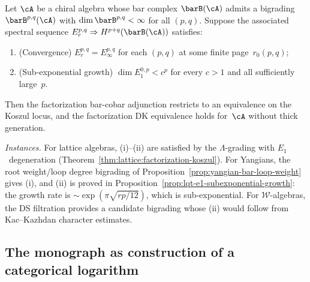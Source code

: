 \begin{conjecture}\label{conj:factorization-finiteness-criterion}
Let $\cA$ be a chiral algebra whose bar complex
$\barB(\cA)$ admits a bigrading
$\barB^{p,q}(\cA)$ with $\dim \barB^{p,q} < \infty$ for all
$(p,q)$.  Suppose the associated spectral sequence
$E_r^{p,q} \Rightarrow H^{p+q}(\barB(\cA))$ satisfies:
\begin{enumerate}[label=\textup{(\roman*)}]
\item \textup{(Convergence)} $E_r^{p,q} = E_\infty^{p,q}$
  for each $(p,q)$ at some finite page~$r_0(p,q)$;
\item \textup{(Sub-exponential growth)} $\dim E_1^{0,p} < c^p$
  for every $c > 1$ and all sufficiently large~$p$.
\end{enumerate}
Then the factorization bar-cobar adjunction restricts to an
equivalence on the Koszul locus, and the factorization DK
equivalence holds for~$\cA$ without thick generation.

\emph{Instances.}
For lattice algebras, (i)--(ii) are satisfied by the
$\Lambda$-grading with $E_1$~degeneration
\textup{(}Theorem~\textup{\ref{thm:lattice:factorization-koszul})}.
For Yangians, the root weight/loop degree bigrading of
Proposition~\textup{\ref{prop:yangian-bar-loop-weight}} gives (i),
and (ii) is proved in
Proposition~\textup{\ref{prop:lqt-e1-subexponential-growth}}: the
growth rate is $\sim\exp(\pi\sqrt{rp/12})$, which is sub-exponential.
For $\mathcal{W}$-algebras, the DS filtration provides a candidate
bigrading whose (ii) would follow from Kac--Kazhdan character
estimates.
\end{conjecture}

\subsection{The monograph as construction of a categorical logarithm}
\label{subsec:monograph-as-log}

